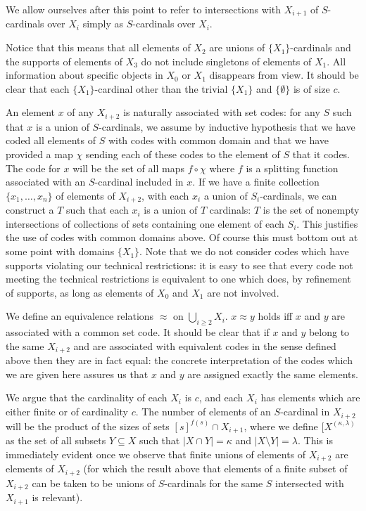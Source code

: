\documentclass{article}
\begin{document}
\begin{description}
We allow ourselves after this point to refer to intersections with $X_{i+1}$ of $S$-cardinals over $X_i$ simply as $S$-cardinals over $X_i$.

   Notice that this means that all elements of $X_2$ are unions of $\{X_1\}$-cardinals and the supports of elements of $X_3$ do not include singletons of elements of $X_1$.  All information
about specific objects in $X_0$ or $X_1$ disappears from view.  It should be clear that each $\{X_1\}$-cardinal other than the trivial $\{X_1\}$ and $\{\emptyset\}$ is of size $c$.

An element $x$ of any $X_{i+2}$ is naturally associated with set codes:  for any $S$ such that $x$ is a union of $S$-cardinals, we assume by inductive hypothesis that we have coded all elements of
$S$ with codes with common domain and that we have provided a map $\chi$ sending each of these codes to the element of $S$ that it codes.  The code for $x$ will be the set of all
maps $f \circ \chi$ where $f$ is a splitting function associated with an $S$-cardinal included in $x$.  If we have a finite collection $\{x_1,\ldots,x_n\}$ of elements of $X_{i+2}$, with each $x_i$ a union of $S_i$-cardinals, we can construct a $T$ such that each $x_i$ is a union of $T$ cardinals:  $T$ is the set of nonempty intersections of collections of sets containing one element of each $S_i$.  This justifies
the use of codes with common domains above.  Of course this must bottom out at some point with  domains  $\{X_1\}$.  Note that we do not consider codes which have supports violating our technical restrictions:  it is easy to see that every code not meeting the technical restrictions is equivalent to one which does, by refinement of supports, as long as elements of $X_0$ and $X_1$ are not involved.

We define an equivalence relations $\approx$ on $\bigcup_{i \geq 2} X_i$.  $x \approx y$ holds iff $x$ and $y$ are associated with a common set code.  It should be clear that if $x$ and $y$ belong to the same
$X_{i+2}$ and are associated with equivalent codes in the sense defined above then they are in fact equal:  the concrete interpretation of the codes which we are given here assures us that $x$ and
$y$ are assigned exactly the same elements.

We argue that the cardinality of each $X_i$ is $c$, and each $X_i$ has elements which are either finite or of cardinality $c$.  The number of elements of an $S$-cardinal in $X_{i+2}$ will be the product of the sizes
of sets $[s]^{f(s)} \cap X_{i+1}$, where we define $[X^{(\kappa,\lambda)}$ as the set of all subsets $Y \subseteq X$ such that $|X \cap Y| = \kappa$ and $|X \setminus Y| = \lambda$.  This is immediately evident once we observe that finite unions of elements of $X_{i+2}$ are elements of $X_{i+2}$ (for which the result above that elements of a finite subset of $X_{i+2}$ can be taken to be unions of $S$-cardinals for the same $S$ intersected with $X_{i+1}$ is relevant).


\end{description}
\end{document}
